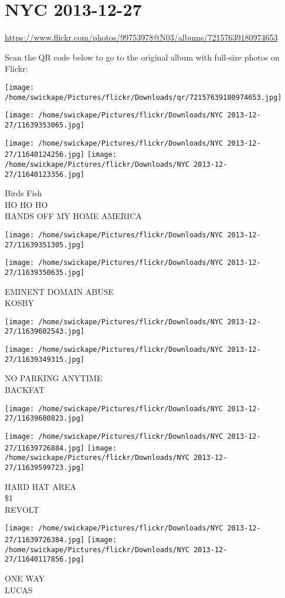 \documentclass[10pt,letterpaper]{article}
\title{}
\author{}
\date{}
\begin{document}
\section*{NYC 2013-12-27}

\url{https://www.flickr.com/photos/99753978@N03/albums/72157639180974653}

Scan the QR code below to go to the original album with full-size photos on Flickr:

\texttt{[image: /home/swickape/Pictures/flickr/Downloads/qr/72157639180974653.jpg]}
\pagebreak

\texttt{[image: /home/swickape/Pictures/flickr/Downloads/NYC 2013-12-27/11639353065.jpg]}

\vspace{0.25in}
\texttt{[image: /home/swickape/Pictures/flickr/Downloads/NYC 2013-12-27/11640124256.jpg]}
\texttt{[image: /home/swickape/Pictures/flickr/Downloads/NYC 2013-12-27/11640123356.jpg]}

Birds Fish\\
HO HO HO\\
HANDS OFF MY HOME AMERICA
\pagebreak

\texttt{[image: /home/swickape/Pictures/flickr/Downloads/NYC 2013-12-27/11639351305.jpg]}

\vspace{0.25in}
\texttt{[image: /home/swickape/Pictures/flickr/Downloads/NYC 2013-12-27/11639350635.jpg]}

EMINENT DOMAIN ABUSE\\
KOSBY
\pagebreak

\texttt{[image: /home/swickape/Pictures/flickr/Downloads/NYC 2013-12-27/11639602543.jpg]}

\vspace{0.25in}
\texttt{[image: /home/swickape/Pictures/flickr/Downloads/NYC 2013-12-27/11639349315.jpg]}

NO PARKING ANYTIME\\
BACKFAT
\pagebreak

\texttt{[image: /home/swickape/Pictures/flickr/Downloads/NYC 2013-12-27/11639600823.jpg]}

\vspace{0.25in}
\texttt{[image: /home/swickape/Pictures/flickr/Downloads/NYC 2013-12-27/11639726884.jpg]}
\texttt{[image: /home/swickape/Pictures/flickr/Downloads/NYC 2013-12-27/11639599723.jpg]}

HARD HAT AREA\\
\$1\\
REVOLT
\pagebreak

\texttt{[image: /home/swickape/Pictures/flickr/Downloads/NYC 2013-12-27/11639726384.jpg]}
\texttt{[image: /home/swickape/Pictures/flickr/Downloads/NYC 2013-12-27/11640117856.jpg]}

ONE WAY\\
LUCAS
\pagebreak
\end{document}
